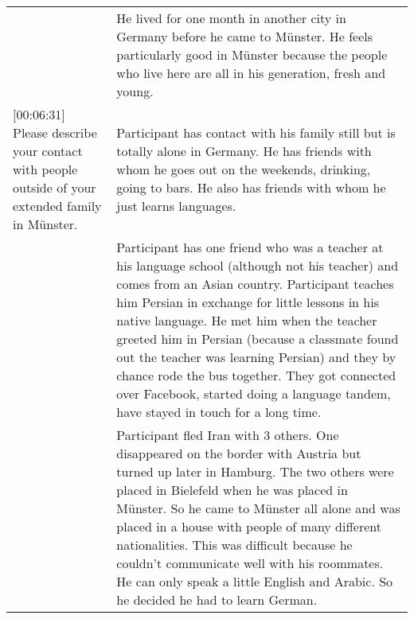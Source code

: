 \begin{longtable}{p{}p{}}
                                                                                                                                                                & He lived for one month in another city in Germany before he came to Münster. He feels particularly good in Münster because the people who live here are all in his generation, fresh and young.                                                                                                                                                                                                                                                                                                                                                                                                 \\
{[}00:06:31{]} Please describe your contact with people outside of your extended family in Münster.                                                             & Participant has contact with his family still but is totally alone in Germany. He has friends with whom he goes out on the weekends, drinking, going to bars. He also has friends with whom he just learns languages.                                                                                                                                                                                                                                                                                                                                                                           \\
                                                                                                                                                                & Participant has one friend who was a teacher at his language school (although not his teacher) and comes from an Asian country. Participant teaches him Persian in exchange for little lessons in his native language. He met him when the teacher greeted him in Persian (because a classmate found out the teacher was learning Persian) and they by chance rode the bus together. They got connected over Facebook, started doing a language tandem, have stayed in touch for a long time.                                                                                                    \\
                                                                                                                                                                & Participant fled Iran with 3 others. One disappeared on the border with Austria but turned up later in Hamburg. The two others were placed in Bielefeld when he was placed in Münster. So he came to Münster all alone and was placed in a house with people of many different nationalities. This was difficult because he couldn't communicate well with his roommates. He can only speak a little English and Arabic. So he decided he had to learn German.                                                                                                                                \\

\end{longtable}
